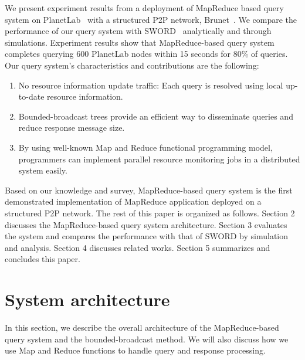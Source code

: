 \documentclass{acm_proc_article-sp}
\begin{document}
We present experiment results from a deployment of MapReduce based query system on PlanetLab~\cite{planetlab} with a structured P2P network, Brunet~\cite{brunet}. 
We compare the performance of our query system with SWORD~\cite{sword} analytically and through simulations.
Experiment results show that MapReduce-based query system completes querying 600 PlanetLab nodes within 15 seconds for 80\% of queries.
Our query system's characteristics and contributions are the following:
\begin{enumerate}
\setlength{\itemsep}{0pt}
\setlength{\parskip}{0pt}
\item No resource information update traffic: Each query is resolved using local up-to-date resource information.
\item Bounded-broadcast trees provide an efficient way to disseminate queries and reduce response message size.
\item By using well-known Map and Reduce functional programming model, programmers can implement parallel resource monitoring jobs in a distributed system easily.
\end{enumerate}
Based on our knowledge and survey, MapReduce-based query system is the first demonstrated implementation of MapReduce application deployed on a structured P2P network.
The rest of this paper is organized as follows. 
Section 2 discusses the MapReduce-based query system architecture. 
Section 3 evaluates the system and compares the performance with that of SWORD by simulation and analysis. Section 4 discusses related works.
Section 5 summarizes and concludes this paper.

\section{System architecture}
In this section, we describe the overall architecture of the MapReduce-based query system and the bounded-broadcast method. 
We will also discuss how we use Map and Reduce functions to handle query and response processing.
\end{document}
